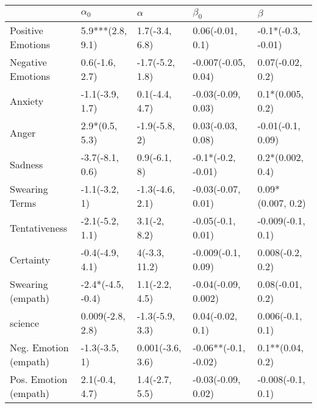 \begin{tabular}{lllll}
\toprule
{} &         $\alpha_0$ &          $\alpha$ &             $\beta_0$ &             $\beta$ \\
\midrule
Positive Emotions     &   5.9***(2.8, 9.1) &    1.7(-3.4, 6.8) &      0.06(-0.01, 0.1) &  -0.1*(-0.3, -0.01) \\
Negative Emotions     &     0.6(-1.6, 2.7) &   -1.7(-5.2, 1.8) &   -0.007(-0.05, 0.04) &    0.07(-0.02, 0.2) \\
Anxiety               &    -1.1(-3.9, 1.7) &    0.1(-4.4, 4.7) &    -0.03(-0.09, 0.03) &    0.1*(0.005, 0.2) \\
Anger                 &     2.9*(0.5, 5.3) &     -1.9(-5.8, 2) &     0.03(-0.03, 0.08) &   -0.01(-0.1, 0.09) \\
Sadness               &    -3.7(-8.1, 0.6) &      0.9(-6.1, 8) &    -0.1*(-0.2, -0.01) &    0.2*(0.002, 0.4) \\
Swearing Terms        &      -1.1(-3.2, 1) &   -1.3(-4.6, 2.1) &    -0.03(-0.07, 0.01) &   0.09*(0.007, 0.2) \\
Tentativeness         &    -2.1(-5.2, 1.1) &      3.1(-2, 8.2) &     -0.05(-0.1, 0.01) &   -0.009(-0.1, 0.1) \\
Certainty             &    -0.4(-4.9, 4.1) &     4(-3.3, 11.2) &    -0.009(-0.1, 0.09) &    0.008(-0.2, 0.2) \\
Swearing (empath)     &  -2.4*(-4.5, -0.4) &    1.1(-2.2, 4.5) &   -0.04(-0.09, 0.002) &    0.08(-0.01, 0.2) \\
science               &   0.009(-2.8, 2.8) &   -1.3(-5.9, 3.3) &      0.04(-0.02, 0.1) &    0.006(-0.1, 0.1) \\
Neg. Emotion (empath) &      -1.3(-3.5, 1) &  0.001(-3.6, 3.6) &  -0.06**(-0.1, -0.02) &    0.1**(0.04, 0.2) \\
Pos. Emotion (empath) &     2.1(-0.4, 4.7) &    1.4(-2.7, 5.5) &    -0.03(-0.09, 0.02) &   -0.008(-0.1, 0.1) \\
\bottomrule
\end{tabular}
